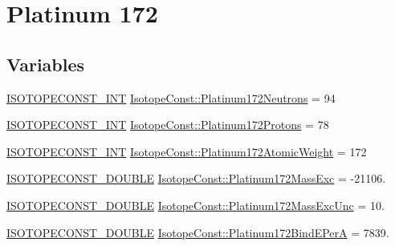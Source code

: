 \hypertarget{group___isotope_const-_platinum-_pt172}{}\section{Platinum 172}
\label{group___isotope_const-_platinum-_pt172}
\subsection*{Variables}
\begin{DoxyCompactItemize}
\item 
\mbox{\hyperlink{group___isotope_const-_macros_ga5f18360b3e99483a35c32d789e62621c}{I\+S\+O\+T\+O\+P\+E\+C\+O\+N\+S\+T\+\_\+\+I\+NT}} \mbox{\hyperlink{group___isotope_const-_platinum-_pt172_gad1b6254dd90540df8d07b41da8d48ba6}{Isotope\+Const\+::\+Platinum172\+Neutrons}} = 94
\item 
\mbox{\hyperlink{group___isotope_const-_macros_ga5f18360b3e99483a35c32d789e62621c}{I\+S\+O\+T\+O\+P\+E\+C\+O\+N\+S\+T\+\_\+\+I\+NT}} \mbox{\hyperlink{group___isotope_const-_platinum-_pt172_ga7bce0e0da6a9c1a83e3ac3d7ecc1aafc}{Isotope\+Const\+::\+Platinum172\+Protons}} = 78
\item 
\mbox{\hyperlink{group___isotope_const-_macros_ga5f18360b3e99483a35c32d789e62621c}{I\+S\+O\+T\+O\+P\+E\+C\+O\+N\+S\+T\+\_\+\+I\+NT}} \mbox{\hyperlink{group___isotope_const-_platinum-_pt172_gaed4cf0662a03d9cf213945681ecacc76}{Isotope\+Const\+::\+Platinum172\+Atomic\+Weight}} = 172
\item 
\mbox{\hyperlink{group___isotope_const-_macros_ga8f45a7272ce02c0b4c65c44636ed719a}{I\+S\+O\+T\+O\+P\+E\+C\+O\+N\+S\+T\+\_\+\+D\+O\+U\+B\+LE}} \mbox{\hyperlink{group___isotope_const-_platinum-_pt172_ga5dade82ec137486c78f650cb0347925e}{Isotope\+Const\+::\+Platinum172\+Mass\+Exc}} = -\/21106.
\item 
\mbox{\hyperlink{group___isotope_const-_macros_ga8f45a7272ce02c0b4c65c44636ed719a}{I\+S\+O\+T\+O\+P\+E\+C\+O\+N\+S\+T\+\_\+\+D\+O\+U\+B\+LE}} \mbox{\hyperlink{group___isotope_const-_platinum-_pt172_ga5de499710f35c963ac0c4c0349d99034}{Isotope\+Const\+::\+Platinum172\+Mass\+Exc\+Unc}} = 10.
\item 
\mbox{\hyperlink{group___isotope_const-_macros_ga8f45a7272ce02c0b4c65c44636ed719a}{I\+S\+O\+T\+O\+P\+E\+C\+O\+N\+S\+T\+\_\+\+D\+O\+U\+B\+LE}} \mbox{\hyperlink{group___isotope_const-_platinum-_pt172_gabb66197a231035a21333ea0fc3908568}{Isotope\+Const\+::\+Platinum172\+Bind\+E\+PerA}} = 7839.
\item 

\end{DoxyCompactItemize}
